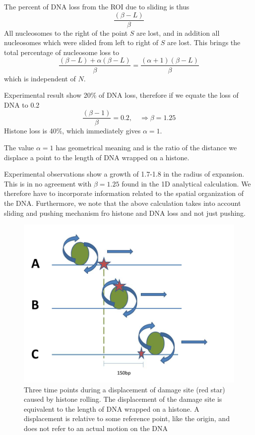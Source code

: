 \documentclass[12pt]{report}
\begin{document}
   The percent of DNA loss from the ROI due to sliding is thus 
   \begin{equation}
   \frac{(\beta-L)}{\beta}
   \end{equation}
   All nucleosomes to the right of the point $S$ are lost, and in addition all nucleosomes which were slided from left to right of $S$ are lost. This brings the total percentage of nucleosome loss to 
   \begin{equation*}
   \frac{(\beta-L) +\alpha(\beta -L)}{\beta}= \frac{(\alpha+1)(\beta -L)}{\beta}
   \end{equation*}
   which is independent of $N$.
   
   Experimental result show 20\% of DNA loss, therefore if we equate the loss of DNA to 0.2 
   \begin{equation*}
   \frac{(\beta -1)}{\beta}=0.2, \quad \Rightarrow \beta = 1.25
   \end{equation*}     
   Histone loss is 40\%, which immediately gives $\alpha =1$.
   
   The value $\alpha=1$ has geometrical meaning and is the ratio of the distance we displace a point to the length of DNA wrapped on a histone. 
   
   Experimental observations show a growth of 1.7-1.8 in the radius of expansion. This is in no agreement with $\beta=1.25$ found in the 1D analytical calculation. We therefore have to incorporate information related to the spatial organization of the DNA. Furthermore, we note that the above calculation takes into account sliding and pushing mechanism fro histone and DNA loss and not just pushing.
   
   
   \begin{figure}
   	\centering
   	\includegraphics[width=0.7\linewidth]{Images/SlidingModel/histoneSlidingSingle}
   	\caption{{Three time points during a displacement of damage site (red star) caused by histone rolling. The displacement of the damage site is equivalent to the length of DNA wrapped on a histone. A displacement is relative to some reference point, like the origin, and does not refer to an actual motion on the DNA}}
   	\label{fig:histoneSlidingSingle}
   \end{figure}
   
\end{document}
